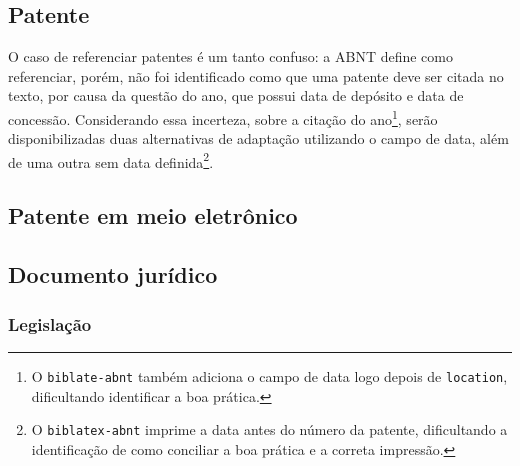   \exOutros

\subsection{Patente} %
O caso de referenciar patentes é um tanto confuso: a ABNT define como referenciar, porém, não foi identificado como que uma patente deve ser citada no texto, por causa da questão do ano, que possui data de depósito e data de concessão. Considerando essa incerteza, sobre a citação do ano\footnote{O \texttt{biblate-abnt} também adiciona o campo de data logo depois de \texttt{location}, dificultando identificar a boa prática.}, serão disponibilizadas duas alternativas de adaptação utilizando o campo de data, além de uma outra sem data definida\footnote{O \texttt{biblatex-abnt} imprime a data antes do número da patente, dificultando a identificação de como conciliar a boa prática e a correta impressão.}.
  \exEssencial

  \exOutros

\subsection{Patente em meio eletrônico} %
  \exEssencial

\subsection{Documento jurídico} %

\subsubsection{Legislação} %
  \exEssencial

  \exOutros

